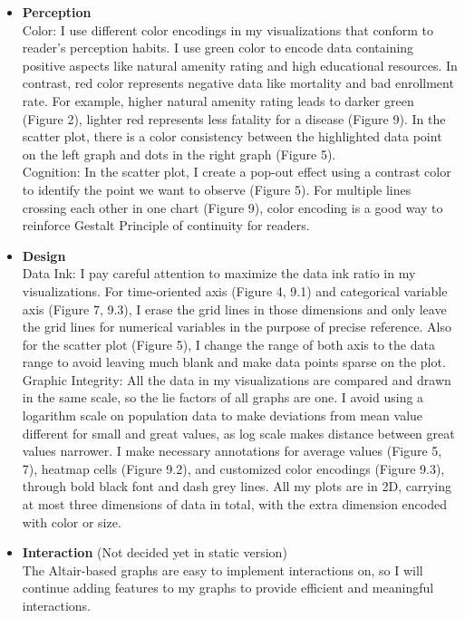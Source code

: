 \documentclass{article}
\begin{document}
\begin{itemize}
    \item \textbf{Perception} \\
    Color: I use different color encodings in my visualizations that conform to reader's perception habits. I use green color to encode data containing positive aspects like natural amenity rating and high educational resources. In contrast, red color represents negative data like mortality and bad enrollment rate. For example, higher natural amenity rating leads to darker green (Figure 2), lighter red represents less fatality for a disease (Figure 9). In the scatter plot, there is a color consistency between the highlighted data point on the left graph and dots in the right graph (Figure 5). \\ 
    \noindent
    Cognition: In the scatter plot, I create a pop-out effect using a contrast color to identify the point we want to observe (Figure 5). For multiple lines crossing each other in one chart (Figure 9), color encoding is a good way to reinforce Gestalt Principle of continuity for readers.
    \item \textbf{Design} \\
    Data Ink: I pay careful attention to maximize the data ink ratio in my visualizations. For time-oriented axis (Figure 4, 9.1) and categorical variable axis (Figure 7, 9.3), I erase the grid lines in those dimensions and only leave the grid lines for numerical variables in the purpose of precise reference. Also for the scatter plot (Figure 5), I change the range of both axis to the data range to avoid leaving much blank and make data points sparse on the plot. \\
    \noindent
    Graphic Integrity: All the data in my visualizations are compared and drawn in the same scale, so the lie factors of all graphs are one. I avoid using a logarithm scale on population data to make deviations from mean value different for small and great values, as log scale makes distance between great values narrower. I make necessary annotations for average values (Figure 5, 7), heatmap cells (Figure 9.2), and customized color encodings (Figure 9.3), through bold black font and dash grey lines. All my plots are in 2D, carrying at most three dimensions of data in total, with the extra dimension encoded with color or size. 
    \item \textbf{Interaction}
    (Not decided yet in static version) \\
    \noindent
    The Altair-based graphs are easy to implement interactions on, so I will continue adding features to my graphs to provide efficient and meaningful interactions.
\end{itemize}
\end{document}
